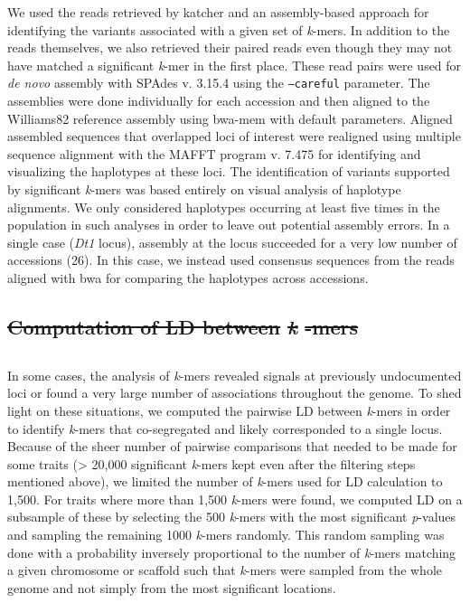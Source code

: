 \documentclass{article}
\providecommand{\DIFaddtex}[1]{{\protect\color{blue}\uwave{#1}}} %
\providecommand{\DIFdeltex}[1]{{\protect\color{red}\sout{#1}}}                      %
\providecommand{\DIFaddbegin}{} %
\providecommand{\DIFaddend}{} %
\providecommand{\DIFdelbegin}{} %
\providecommand{\DIFdelend}{} %
\providecommand{\DIFadd}[1]{\texorpdfstring{\DIFaddtex{#1}}{#1}} %
\providecommand{\DIFdel}[1]{\texorpdfstring{\DIFdeltex{#1}}{}} %
\newcommand{\DIFscaledelfig}{0.5}
\newlength{\DIFdelgraphicswidth} %
\newlength{\DIFdelgraphicsheight} %
\newcommand{\DIFaddincludegraphics}[2][]{{\color{blue}\fbox{\DIFOincludegraphics[#1]{#2}}}} %
\newcommand{\DIFdelincludegraphics}[2][]{%
\sbox{\DIFdelgraphicsbox}{\DIFOincludegraphics[#1]{#2}}%
\settoboxwidth{\DIFdelgraphicswidth}{\DIFdelgraphicsbox} %
\settoboxtotalheight{\DIFdelgraphicsheight}{\DIFdelgraphicsbox} %
\scalebox{\DIFscaledelfig}{%
\parbox[b]{\DIFdelgraphicswidth}{\usebox{\DIFdelgraphicsbox}\\[-\baselineskip] \rule{\DIFdelgraphicswidth}{0em}}\llap{\resizebox{\DIFdelgraphicswidth}{\DIFdelgraphicsheight}{%
\setlength{\unitlength}{\DIFdelgraphicswidth}%
\begin{picture}(1,1)%
\thicklines\linethickness{2pt} %
{\color[rgb]{1,0,0}\put(0,0){\framebox(1,1){}}}%
{\color[rgb]{1,0,0}\put(0,0){\line( 1,1){1}}}%
{\color[rgb]{1,0,0}\put(0,1){\line(1,-1){1}}}%
\end{picture}%
}\hspace*{3pt}}} %
} %
\DeclareRobustCommand{\DIFaddbegin}{\DIFOaddbegin \let\includegraphics\DIFaddincludegraphics} %
\DeclareRobustCommand{\DIFaddend}{\DIFOaddend \let\includegraphics\DIFOincludegraphics} %
\DeclareRobustCommand{\DIFdelbegin}{\DIFOdelbegin \let\includegraphics\DIFdelincludegraphics} %
\DeclareRobustCommand{\DIFdelend}{\DIFOaddend \let\includegraphics\DIFOincludegraphics} %
\begin{document}
We used the reads retrieved by katcher and an assembly-based approach for
identifying the variants associated with a given set of \emph{k}-mers. In
addition to the reads themselves, we also retrieved their paired reads even
though they may not have matched a significant \emph{k}-mer in the first place.
These read pairs were used for \emph{de novo} assembly with SPAdes v. 3.15.4
 using the \texttt{--careful} parameter. The assemblies were done
individually for each accession and then aligned to the Williams82 reference
assembly using bwa-mem with default parameters.  Aligned assembled sequences
that overlapped loci of interest were realigned using multiple sequence
alignment with the MAFFT program v. 7.475  for identifying and
visualizing the haplotypes at these loci. The identification of variants
supported by significant \textit{k}-mers was based entirely on visual analysis
of haplotype alignments. We only considered haplotypes occurring at least five
times in the population in such analyses in order to leave out potential
assembly errors. In a single case (\emph{Dt1} locus), assembly at the locus
succeeded for a very low number of accessions (26). In this case, we instead used
consensus sequences from the reads aligned with bwa for comparing the
haplotypes across accessions. 

\DIFdelbegin \subsection*{\DIFdel{Computation of LD between }\emph{\DIFdel{k}}%
\DIFdel{-mers}}
\DIFdelend \DIFaddbegin \subsection{\DIFadd{Computation of LD between }\emph{\DIFadd{k}}\DIFadd{-mers}}
\DIFaddend 

In some cases, the analysis of \emph{k}-mers revealed signals at previously
undocumented loci or found a very large number of associations throughout the
genome. To shed light on these situations, we computed the pairwise LD between
\emph{k}-mers in order to identify \emph{k}-mers that co-segregated and
likely corresponded to a single locus. Because of the sheer number of pairwise
comparisons that needed to be made for some traits (> 20,000 significant
\emph{k}-mers kept even after the filtering steps mentioned above), we limited
the number of \emph{k}-mers used for LD calculation to 1,500. For traits where
more than 1,500 \emph{k}-mers were found, we computed LD on a subsample of
these by selecting the 500 \emph{k}-mers with the most significant
\emph{p}-values and sampling the remaining 1000 \emph{k}-mers randomly. This
random sampling was done with a probability inversely proportional to the
number of \emph{k}-mers matching a given chromosome or scaffold such that
\emph{k}-mers were sampled from the whole genome and not simply from the most
significant locations.
\end{document}
